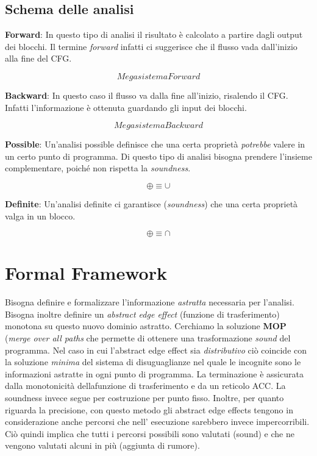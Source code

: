 \documentclass[a4paper, 10pt]{book}
\begin{document}
\subsection{Schema delle analisi}
\quad\textbf{Forward}: In questo tipo di analisi il risultato è calcolato a partire dagli output dei blocchi. Il
termine \emph{forward} infatti ci suggerisce che il flusso vada dall'inizio alla fine del CFG.

$$Mega sistema Forward$$

\textbf{Backward}: In questo caso il flusso va dalla fine all'inizio, risalendo il CFG. Infatti l'informazione
è ottenuta guardando gli input dei blocchi.

$$Mega sistema Backward$$

\textbf{Possible}: Un'analisi possible definisce che una certa proprietà \emph{potrebbe} valere in un certo
punto di programma. Di questo tipo di analisi bisogna prendere l'insieme complementare, poiché non rispetta
la \emph{soundness}.

$$\oplus \equiv \cup$$

\textbf{Definite}: Un'analisi definite ci garantisce (\emph{soundness}) che una certa proprietà valga in 
un blocco.

$$\oplus \equiv \cap$$

\section{Formal Framework}
Bisogna definire e formalizzare l'informazione \emph{astratta} necessaria per l'analisi. Bisogna inoltre
definire un \emph{abstract edge effect} (funzione di trasferimento) monotona su questo nuovo dominio astratto.
Cerchiamo la soluzione \textbf{MOP} (\emph{merge over all paths} che permette di ottenere una trasformazione
\emph{sound} del programma. Nel caso in cui l'abstract edge effect sia \emph{distributivo} ciò coincide con
la soluzione \emph{minima} del sistema di disuguaglianze nel quale le incognite sono le informazioni astratte
in ogni punto di programma.
\newline
La terminazione è assicurata dalla monotonicità dellafunzione di trasferimento e da un reticolo ACC. La
soundness invece segue per costruzione per punto fisso. Inoltre, per quanto riguarda la precisione, con
questo metodo gli abstract edge effects tengono in considerazione anche percorsi che nell' esecuzione 
sarebbero invece impercorribili. Ciò quindi implica che tutti i percorsi possibili sono valutati (sound) e che
ne vengono valutati alcuni in più (aggiunta di rumore).
\end{document}
